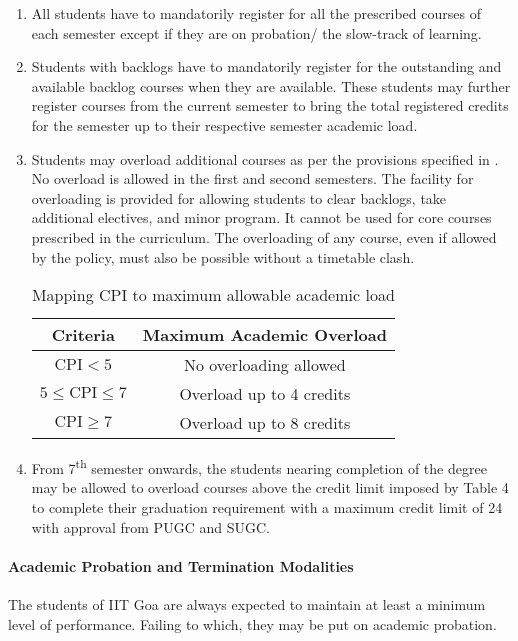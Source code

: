 \begin{enumerate}[leftmargin=15mm]
    \item All students have to mandatorily register for all the prescribed courses of each semester except if they are on probation/ the slow-track of learning. 
    \item Students with backlogs have to mandatorily register for the outstanding and available backlog courses when they are available. These students may further register courses from the current semester to bring the total registered credits for the semester up to their respective semester academic load.
    \item Students may overload additional courses as per the provisions specified in . No overload is allowed in the first and second semesters. The facility for overloading is provided for allowing students to clear backlogs, take additional electives, and minor program. It cannot be used for core courses prescribed in the curriculum. The overloading of any course, even if allowed by the policy, must also be possible without a timetable clash.

    \begin{table}[t]
        \centering
        \begin{tabular}{c c}
        \toprule
        \textbf{Criteria}   & \textbf{Maximum Academic Overload} \\
        \midrule
        {} {} $\mathrm{CPI}< 5$   & No overloading allowed \\
        $5 \leq \mathrm{CPI} \le  7$   & Overload up to 4 credits \\
        {} {} $\mathrm{CPI} \geq  7$   & Overload up to 8 credits \\
       \bottomrule
        \end{tabular}
        \caption{Mapping CPI to maximum allowable academic load}
        \label{tab:Mapping CPI to maximum allowable academic load}
    \end{table}

    \item From 7\textsuperscript{th} semester onwards, the students nearing completion of the degree may be allowed to overload courses above the credit limit imposed by Table 4 to complete their graduation requirement with a maximum credit limit of 24 with approval from PUGC and SUGC. 
\end{enumerate}

\paragraph{Academic Probation and Termination Modalities} The students of IIT Goa are always expected to maintain at least a minimum level of performance. Failing to which, they may be put on academic probation.


